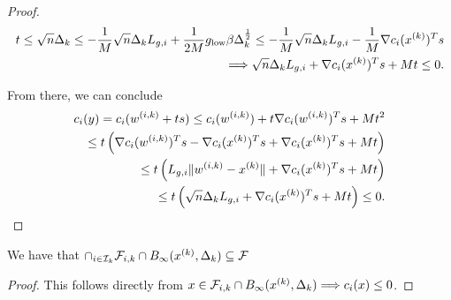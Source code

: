 \begin{proof}
\begin{align*}
t 
\le \sqrt{n} \Delta_k 
\le -\frac 1 M \sqrt{n}\Delta_k {L_{g, i}} + \frac 1 {2M} g_{\text{low}} \beta \Delta_k^{\frac 1 2} 
\le -\frac 1 M \sqrt{n}\Delta_k {L_{g, i}} -\frac 1 M \nabla c_i({x^{(k)}})^Ts \\
\Longrightarrow \sqrt{n}\Delta_k {L_{g, i}} + \nabla c_i({x^{(k)}})^Ts + M t \le 0.
\end{align*}

From there, we can conclude
\begin{align*}
c_i(y) = c_i({w^{(i, k)}} + ts) \le c_i({w^{(i, k)}}) + t\nabla c_i({w^{(i, k)}})^Ts + M t^2 \\
\le t \left(\nabla c_i({w^{(i, k)}})^Ts - \nabla c_i({x^{(k)}})^Ts + \nabla c_i({x^{(k)}})^Ts + M t\right) \\
\le t \left({L_{g, i}}\|{w^{(i, k)}} - {x^{(k)}}\| + \nabla c_i({x^{(k)}})^Ts + M t\right) \\
\le t \left(\sqrt{n}\Delta_k {L_{g, i}} + \nabla c_i({x^{(k)}})^Ts + M t\right) \le 0.
\end{align*}



\end{proof}



\begin{theorem}
We have that $\cap_{i \in {\mathcal I_{k}}} {\mathcal F_{i, k}} \cap B_{\infty}({x^{(k)}}, \Delta_k) \subseteq {\mathcal F}$ 
\end{theorem}

\begin{proof}
This follows directly from $x \in {\mathcal F_{i, k}} \cap B_{\infty}({x^{(k)}}, \Delta_k) \Longrightarrow c_i(x) \le 0$.
\end{proof}



